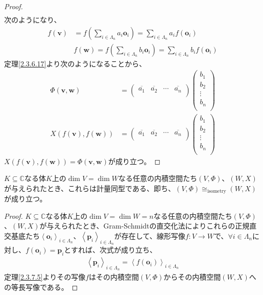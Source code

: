 \documentclass[dvipdfmx]{jsarticle}
\begin{document}
\begin{proof}
\begin{align*}
\end{align*}
次のようになり、
\begin{align*}
f\left( \mathbf{v} \right) &= f\left( \sum_{i \in \varLambda_{n}} {a_{i}\mathbf{o}_{i}} \right) = \sum_{i \in \varLambda_{n}} {a_{i}f\left( \mathbf{o}_{i} \right)}\\
&f\left( \mathbf{w} \right) = f\left( \sum_{i \in \varLambda_{n}} {b_{i}\mathbf{o}_{i}} \right) = \sum_{i \in \varLambda_{n}} {b_{i}f\left( \mathbf{o}_{i} \right)}
\end{align*}
定理\ref{2.3.6.17}より次のようになることから、
\begin{align*}
\varPhi \left( \mathbf{v},\mathbf{w} \right) &= \begin{pmatrix}
\overline{a_{1}} & \overline{a_{2}} & \cdots & \overline{a_{n}} \\
\end{pmatrix}\begin{pmatrix}
b_{1} \\
b_{2} \\
 \vdots \\
b_{n} \\
\end{pmatrix}\\
X\left( f\left( \mathbf{v} \right),f\left( \mathbf{w} \right) \right) &= \begin{pmatrix}
\overline{a_{1}} & \overline{a_{2}} & \cdots & \overline{a_{n}} \\
\end{pmatrix}\begin{pmatrix}
b_{1} \\
b_{2} \\
 \vdots \\
b_{n} \\
\end{pmatrix}
\end{align*}
$X\left( f\left( \mathbf{v} \right),f\left( \mathbf{w} \right) \right) = \varPhi \left( \mathbf{v},\mathbf{w} \right)$が成り立つ。
\end{proof}
\begin{thm}\label{2.3.7.6}
$K \subseteq \mathbb{C}$なる体$K$上の$\dim V = \dim W$なる任意の内積空間たち$(V,\varPhi )$、$(W,X)$が与えられたとき、これらは計量同型である、即ち、$(V,\varPhi ) \cong_{\mathrm{isometry}}(W,X)$が成り立つ。
\end{thm}
\begin{proof}
$K \subseteq \mathbb{C}$なる体$K$上の$\dim V = \dim W = n$なる任意の内積空間たち$(V,\varPhi )$、$(W,X)$が与えられたとき、Gram-Schmidtの直交化法によりこれらの正規直交基底たち$\left\langle \mathbf{o}_{i} \right\rangle_{i \in \varLambda_{n}}$、$\left\langle \mathbf{p}_{i} \right\rangle_{i \in \varLambda_{n}}$が存在して、線形写像$f:V \rightarrow W$で、$\forall i \in \varLambda_{n}$に対し、$f\left( \mathbf{o}_{i} \right) = \mathbf{p}_{i}$とすれば、次式が成り立ち、
\begin{align*}
\left\langle \mathbf{p}_{i} \right\rangle_{i \in \varLambda_{n}} = \left\langle f\left( \mathbf{o}_{i} \right) \right\rangle_{i \in \varLambda_{n}}
\end{align*}
定理\ref{2.3.7.5}よりその写像$f$はその内積空間$(V,\varPhi )$からその内積空間$(W,X)$への等長写像である。
\end{proof}
\end{document}
